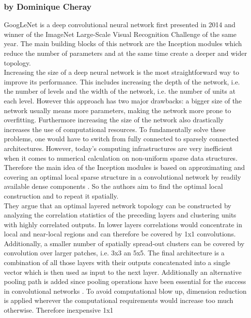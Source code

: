 \documentclass[11pt]{report}
\begin{document}
\subsubsection{by Dominique Cheray}
GoogLeNet is a deep convolutional neural network first presented in 2014 and
winner of the ImageNet Large-Scale Visual Recognition Challenge of the same
year. The main building blocks of this network are the Inception modules which
reduce the number of parameters and at the same time create a deeper and wider
topology. \\
Increasing the size of a deep neural network is the most straightforward way to
improve its performance. This includes increasing the depth of the network, i.e.
the number of levels and the width of the network, i.e. the number of units at
each level. However this approach has two major drawbacks: a bigger size of the
network usually means more parameters, making the network more prone to
overfitting. Furthermore increasing the size of the network also drastically
increases the use of computational resources. To fundamentally solve these
problems, one would have to switch from fully connected to sparsely connected
architectures. However, today's computing infrastructures are very inefficient
when it comes to numerical calculation on non-uniform sparse data structures.
Therefore the main idea of the Inception modules is based on approximating and covering an
optimal local sparse structure in a convolutional network by readily available dense
components \cite{szegedy2015going}. So the authors aim to find the optimal local
construction and to repeat it spatially. \\
They argue that an optimal layered network topology can be constructed by analyzing the
correlation statistics of the preceding layers and clustering units with highly
correlated outputs. In lower layers correlations would concentrate in local and
near-local regions and can therefore be covered by 1x1 convolutions.
Additionally, a smaller number of spatially spread-out clusters can be covered
by convolution over larger patches, i.e. 3x3 an 5x5. The final architecture is a
combination of all those layers with their outputs concatenated into a single
vector which is then used as input to the next layer. Additionally an
alternative pooling path is added since pooling operations have been essential
for the success in convolutional networks \cite{szegedy2015going}. To avoid
computational blow up, dimension reduction is applied wherever the computational
requirements would increase too much otherwise. Therefore inexpensive 1x1
\end{document}

